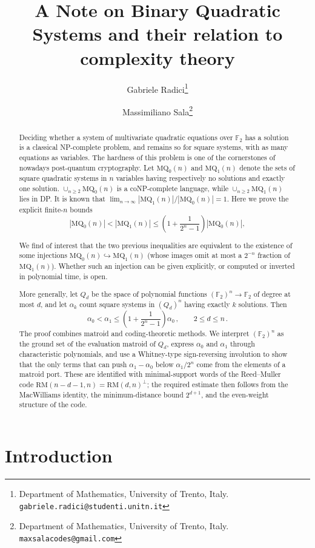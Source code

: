 \documentclass[11pt,a4paper]{article}
\title{\textbf{A Note on Binary Quadratic Systems and their relation to complexity theory}}
\author{%
  Gabriele Radici\thanks{Department of Mathematics, University of Trento, Italy.
  \texttt{gabriele.radici@studenti.unitn.it}}
  \and
  Massimiliano Sala\thanks{Department of Mathematics, University of Trento, Italy.
  \texttt{maxsalacodes@gmail.com}}%
}
\theoremstyle{definition}
\newcommand{\MQ}{\mathrm{MQ}}
\newcommand{\FF}{\mathbb{F}}
\newcommand{\RM}{\mathrm{RM}}
\begin{document}
\maketitle


\begin{abstract}
Deciding whether a system of multivariate quadratic equations over
$\mathbb F_2$ has a solution is a classical NP-complete problem, and remains so for
square systems, with as many equations as variables. 
The hardness of this problem is one of the
cornerstones of nowadays post-quantum cryptography.
Let $\MQ_0(n)$ and $\MQ_1(n)$ denote the sets of square quadratic
systems in $n$ variables having respectively no solutions and exactly
one solution. $\cup_{n\geq 2} \MQ_0(n)$ is a coNP-complete language, while
$\cup_{n\geq 2} \MQ_1(n)$ lies in DP. 
It is known that
$\lim_{n\to \infty} |\MQ_1(n)|/|\MQ_0(n)|=1$.
Here we prove the explicit finite-$n$ bounds
\[
|\MQ_0(n)|<|\MQ_1(n)|
\le
\left(1+\frac{1}{2^n-1}\right)|\MQ_0(n)|,
\]

We find of interest that the two previous inequalities are equivalent to the existence of some injections
$
\MQ_0(n)\hookrightarrow\MQ_1(n)
$
(whose images omit at most a $2^{-n}$ fraction of $\MQ_1(n)$).
Whether such an injection can be given explicitly, or computed or inverted in
polynomial time, is open.


More generally, let $Q_d$ be the space of polynomial functions
$(\FF_2)^n\to\mathbb F_2$ of degree at most $d$, and let $\alpha_k$
count square systems in $(Q_d)^n$ having exactly $k$ solutions. Then
\[
\alpha_0<\alpha_1
\le
\left(1+\frac{1}{2^n-1}\right)\alpha_0\,, \qquad 2\le d\le n \,.
\]
The proof combines matroid and coding-theoretic methods. We interpret
$(\FF_2)^n$ as the ground set of the evaluation matroid of $Q_d$,
express $\alpha_0$ and $\alpha_1$ through characteristic polynomials,
and use a Whitney-type sign-reversing involution to show that the only
terms that can push $\alpha_1-\alpha_0$ below $\alpha_1/2^n$ come from the
elements of a matroid port. These are identified with
minimal-support words of the Reed--Muller code
$\RM(n-d-1,n)=\RM(d,n)^\perp$; the required estimate then follows
from the MacWilliams identity, the minimum-distance bound $2^{d+1}$,
and the even-weight structure of the code.
\end{abstract}


\section{Introduction}\label{sec:intro}
\end{document}
